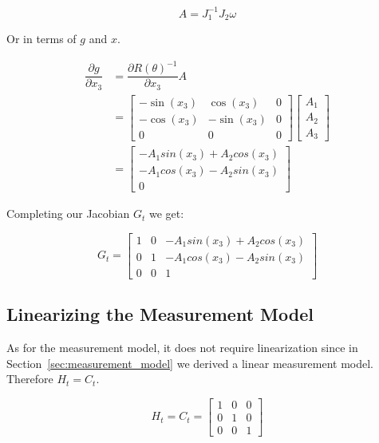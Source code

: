 \documentclass{article}
\begin{document}
\begin{equation}
	A = J_{1}^{-1} J_{2} \omega
\end{equation}

Or in terms of $g$ and $x$.

\begin{align}
	\dfrac{\partial g}{\partial x_{3}} 
	&= \dfrac{\partial R(\theta)^{-1}}{\partial x_{3}} A \\
	&= \begin{bmatrix}
		-\sin(x_{3}) & \cos(x_{3}) & 0 \\
		-\cos(x_{3}) & -\sin(x_{3}) & 0 \\
		0 & 0 & 0
	\end{bmatrix}
	\begin{bmatrix}
		A_{1} \\
		A_{2} \\
		A_{3}
	\end{bmatrix} \\
	&= \begin{bmatrix}
		-A_{1} sin(x_{3}) + A_{2} cos(x_{3}) \\
		-A_{1} cos(x_{3}) - A_{2} sin(x_{3}) \\
		0
	\end{bmatrix}
\end{align}

Completing our Jacobian $G_{t}$ we get:

\begin{equation}
	G_{t} = \begin{bmatrix}
		1 & 0 & -A_{1} sin(x_{3}) + A_{2} cos(x_{3})  \\
		0 & 1 & -A_{1} cos(x_{3}) - A_{2} sin(x_{3}) \\
		0 & 0 & 1
	\end{bmatrix}
\end{equation}





\newpage
\subsection{Linearizing the Measurement Model}
\label{subsec:ekf_measurement_model_linearization}

As for the measurement model, it does not require linearization since in 
Section~\ref{sec:measurement_model} we derived a linear measurement model. 
Therefore $H_{t} = C_{t}$.

\begin{equation}
	H_{t} = C_{t} = 
	\begin{bmatrix}
		1 & 0 & 0 \\
		0 & 1 & 0 \\
		0 & 0 & 1
	\end{bmatrix}
\end{equation}
\end{document}
